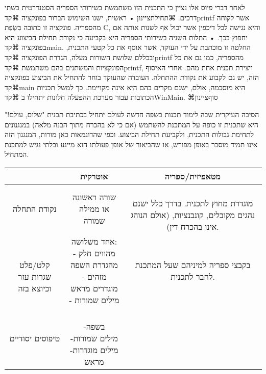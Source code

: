 {לאחר דברי פיוס אלו נציין כי התכנית הזו משתמשת בשירותי הספריה הסטנדרטית בשתי דרכים. 
⌘תחילת{ציינון}
• ראשית, ישנו השימוש הברור בפונקציה ⌘קד{printf} אשר לקוחה מהספריה. פונקציה זו כתובה בִּשְׂפַת C, והיא נגישה לכל דיכפין אשר יכול אף לשנות אותה אם יחפוץ בכך. 
• התלות השניה בשירותי הספריה היא בקביעה כי נקודת תחילת הביצוע היא בפונקציה ⌘קד{main}. החלטה זו מוכתבת על ידי העוקד, אשר אוסף את כל קטעי התכנית, ובכללם שלושת השורות מעלה, הגדרת הפונקציה ⌘קד{printf} מהספריה, כמו גם את כל הפונקציות והמשתנים בהם משתמשת ⌘קד{printf}, ויצירת תכנית אחת מהם. אחרי האיסוף הזה, יש גם לקבוע את נקודת ההתחלה.
העובדה שהעוקד בוחר להתחיל את הביצוע בפונקציה ⌘קד{main} היא מוסכמה, אולם, ישנם מקרים בהם היא אינה מקויימת. כך למשל תכניות הכתובות עבור מערכת ההפעלה חלונות יתחילו ב ⌘קד{WinMain}. 
⌘סוף{ציינון}

הסיבה העיקרית שבה לימוד תכנות בשפה חדשה לעולם יתחיל בכתיבת תכנית "שלום, עולם!" היא שתכנית זו כופה על המתכנת להשתמש (אם כי לא בהכרח מתוך הבנה מלאה) במנגנונים לתחימת גבולות התכנית, ולקביעת תחילת הביצוע. וכפי שהדוגמאות כאן מורות, המנגנון הזה אינו תמיד מוסבר באופן מפורש, או שהביאור של אופן פעולתו הוא מייגע ובלתי נגיש למתכנת המתחיל.

\begin{center}
\begin{tabular}{c c c}
\toprule

& 
אוטרקית
& 
מטאפיזית/ספריה
		 \\
\midrule
נקודת התחלה 
& 
שורה ראשונה או ממילה שמורה 
& 
\pbox{7cm}{
\leavevmode
\newline
מוגדרת מחוץ לתכנית.
בדרך כלל ישנם נהגים מקובלים, קונבנציות, (אולם הנוהג אינו בהכרח דין).
\newline
}
		\\
\pbox{3cm}{
\leavevmode
\newline
קלט/פלט
שגרות עזר וכיוצא בזה
\leavevmode
\newline
}
& 
 אחד משלושה:
\pbox{4cm}{
\leavevmode
\newline
- מהווים חלק מהגדרת השפה
\newline
- מזהים מוגדרים מראש
\newline
- מילים שמורות
\newline
} 
& 
בקבצי ספריה למיניהם שעל המתכנת לחבר לתכנית.
		\\
טיפוסים יסודיים
& 

\pbox{5cm}{
\leavevmode
\newline
-בשפה
\newline
-מילים שמורות
\newline
-מילים מוגדרות מראש
\newline
}




\end{tabular}
\end{center}}
